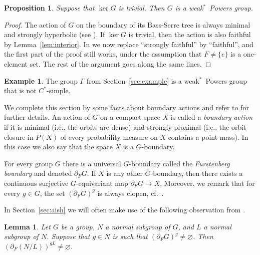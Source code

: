 \documentclass[a4paper]{amsart}
\theoremstyle{plain}
\newtheorem{lemma}[theorem]{Lemma}
\newtheorem{proposition}[theorem]{Proposition}
\theoremstyle{definition}
\newtheorem{example}[theorem]{Example}
\theoremstyle{remark}
\numberwithin{theorem}{section}
\begin{document}
\begin{proposition}
Suppose that $\ker G$ is trivial.
Then $G$ is a weak$^*$~Powers group.
\end{proposition}

\begin{proof}
The action of $G$ on the boundary of its Bass-Serre tree is always minimal and strongly hyperbolic (see \cite[Proposition~19]{HP}).
If $\ker G$ is trivial, then the action is also faithful by Lemma~\ref{lem:interior}.
In \cite[Lemma~4]{Harpe} we now replace ``strongly faithful'' by ``faithful'',
and the first part of the proof still works, under the assumption that $F\neq\{e\}$ is a one-element set.
The rest of the argument goes along the same lines.
\end{proof}

\begin{example}
The group $\Gamma$ from Section~\ref{sec:example} is a weak$^*$~Powers group that is not $C^*$-simple.
\end{example}

We complete this section by some facts about boundary actions and refer to \cite{BKKO,KK,Ozawa} for further details.
An action of $G$ on a compact space $X$ is called a \emph{boundary action} if it is
minimal (i.e., the orbits are dense) and
strongly proximal (i.e., the orbit-closure in $P(X)$ of every probability measure on $X$ contains a point mass).
In this case we also say that the space $X$ is a $G$-boundary.

For every group $G$ there is a universal $G$-boundary called the \emph{Furstenberg boundary} and denoted $\partial_F G$.
If $X$ is any other $G$-boundary, then there exists a continuous surjective $G$-equivariant map $\partial_F G\to X$.
Moreover, we remark that for every $g\in G$, the set $(\partial_F G)^g$ is always clopen, cf.\ \cite[Lemma~3.3]{BKKO}.

In Section~\ref{sec:aish} we will often make use of the following observation from \cite{BKKO}.

\begin{lemma}\label{lem:boundary-subquotient}
Let $G$ be a group, $N$ a normal subgroup of $G$, and $L$ a normal subgroup of $N$.
Suppose that $g\in N$ is such that $(\partial_F G)^g\neq\varnothing$.
Then $(\partial_F(N/L))^{gL}\neq\varnothing$.
\end{lemma}
\end{document}
